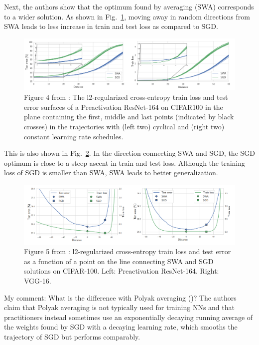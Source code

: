 Next, the authors show that the optimum found by averaging (SWA) corresponds to a wider solution. 
As shown in Fig.~\ref{swawider}, moving away in random directions from SWA leads to less increase in train and test loss as compared to SGD. 
\begin{figure}[H]
	\centering
	\includegraphics[width=1\linewidth]{./Figures/swawider.png}
	\caption{Figure 4 from \textcite{izmailov2019averaging}:  The l2-regularized cross-entropy train loss and test error surfaces of a Preactivation ResNet-164 on CIFAR100 in the plane containing the first, middle and last points (indicated by black crosses) in the trajectories with (left two) cyclical and (right two) constant learning rate schedules.}
	\label{swawider}
\end{figure}
This is also shown in Fig.~\ref{swawider2}. 
In the direction connecting SWA and SGD, the SGD optimum is close to a steep ascent in train and test loss. 
Although the training loss of SGD is smaller than SWA, SWA leads to better generalization. 
\begin{figure}[H]
	\centering
	\includegraphics[width=1\linewidth]{./Figures/swawider2.png}
	\caption{Figure 5 from \textcite{izmailov2019averaging}:  l2-regularized cross-entropy train loss and test error as a function of a point on the line connecting SWA and SGD solutions on CIFAR-100. Left: Preactivation ResNet-164. Right: VGG-16.}
	\label{swawider2}
\end{figure}

My comment: What is the difference with Polyak averaging (\cite{polyak1992acceleration})?
The authors claim that Polyak averaging is not typically used for training NNs and that practitioners instead sometimes use an exponentially decaying running average of the weights found by SGD with a decaying learning rate, which smooths the trajectory of SGD but performs comparably.

